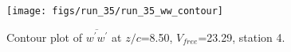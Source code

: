 \begin{figure}[H]
\centering
\texttt{[image: figs/run\_35/run\_35\_ww\_contour]}
\caption{Contour plot of $\overline{w^\prime w^\prime}$ at $z/c$=8.50, $V_{free}$=23.29, station 4.}
\label{fig:run_35_ww_contour}
\end{figure}


